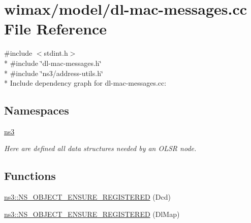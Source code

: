 \hypertarget{dl-mac-messages_8cc}{}\section{wimax/model/dl-\/mac-\/messages.cc File Reference}
\label{dl-mac-messages_8cc}
{\ttfamily \#include $<$stdint.\+h$>$}\\*
{\ttfamily \#include \char`\"{}dl-\/mac-\/messages.\+h\char`\"{}}\\*
{\ttfamily \#include \char`\"{}ns3/address-\/utils.\+h\char`\"{}}\\*
Include dependency graph for dl-\/mac-\/messages.cc\+:
\subsection*{Namespaces}
\begin{DoxyCompactItemize}
\item 
 \hyperlink{namespacens3}{ns3}
\begin{DoxyCompactList}\small\item\em Here are defined all data structures needed by an O\+L\+SR node. \end{DoxyCompactList}\end{DoxyCompactItemize}
\subsection*{Functions}
\begin{DoxyCompactItemize}
\item 
\hyperlink{namespacens3_ab4430fc9284d45b6a1fcd8484e212184}{ns3\+::\+N\+S\+\_\+\+O\+B\+J\+E\+C\+T\+\_\+\+E\+N\+S\+U\+R\+E\+\_\+\+R\+E\+G\+I\+S\+T\+E\+R\+ED} (Dcd)
\item 
\hyperlink{namespacens3_a6366c9db1f389c403953ab970d21729a}{ns3\+::\+N\+S\+\_\+\+O\+B\+J\+E\+C\+T\+\_\+\+E\+N\+S\+U\+R\+E\+\_\+\+R\+E\+G\+I\+S\+T\+E\+R\+ED} (Dl\+Map)
\end{DoxyCompactItemize}
